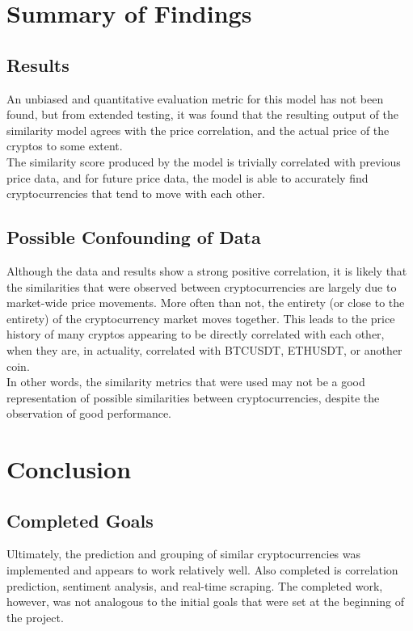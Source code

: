 \documentclass[11pt]{article}
\begin{document}
\section{Summary of Findings}
\subsection{Results}
An unbiased and quantitative evaluation metric for this model has not been found, but from extended testing, it was found that the resulting output of the similarity model agrees with the price correlation, and the actual price of the cryptos to some extent.\\[2mm]

The similarity score produced by the model is trivially correlated with previous price data, and for future price data, the model is able to accurately find cryptocurrencies that tend to move with each other.\\[2mm]

\subsection{Possible Confounding of Data}
Although the data and results show a strong positive correlation, it is likely that the similarities that were observed between cryptocurrencies are largely due to market-wide price movements.  More often than not, the entirety (or close to the entirety) of the cryptocurrency market moves together.  This leads to the price history of many cryptos appearing to be directly correlated with each other, when they are, in actuality, correlated with BTCUSDT, ETHUSDT, or another coin.\\[2mm]
In other words, the similarity metrics that were used may not be a good representation of possible similarities between cryptocurrencies, despite the observation of good performance.\\[2mm]


\section{Conclusion}
\subsection{Completed Goals}
Ultimately, the prediction and grouping of similar cryptocurrencies was implemented and appears to work relatively well.  Also completed is correlation prediction, sentiment analysis, and real-time scraping.  The completed work, however, was not analogous to the initial goals that were set at the beginning of the project.
\end{document}
